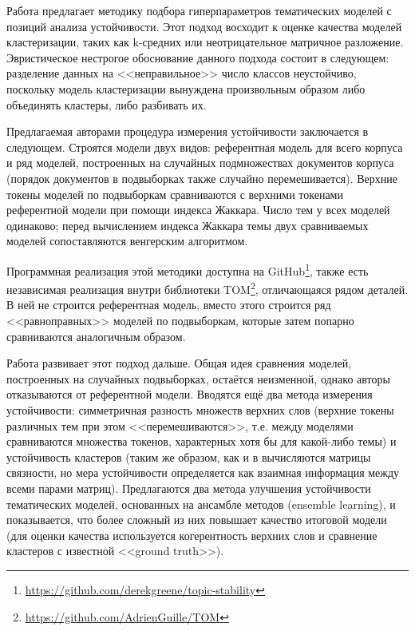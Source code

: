 Работа \cite{greene14howmany} предлагает методику подбора гиперпараметров тематических моделей с позиций анализа устойчивости. Этот подход восходит к оценке качества моделей кластеризации, таких как k-средних или неотрицательное матричное разложение. Эвристическое нестрогое обоснование данного подхода состоит в следующем: разделение данных на <<неправильное>> число классов неустойчиво, поскольку модель кластеризации вынуждена произвольным образом либо объединять кластеры, либо разбивать их.

Предлагаемая авторами процедура измерения устойчивости заключается в следующем. Строятся модели двух видов: референтная модель для всего корпуса и ряд моделей, построенных на случайных подмножествах документов корпуса (порядок документов в подвыборках также случайно перемешивается). Верхние токены моделей по подвыборкам сравниваются с верхними токенами референтной модели при помощи индекса Жаккара. Число тем у всех моделей одинаково; перед вычислением индекса Жаккара темы двух сравниваемых моделей сопоставляются венгерским алгоритмом.

Программная реализация этой методики доступна на GitHub\footnote{\url{https://github.com/derekgreene/topic-stability}}, также есть независимая реализация внутри библиотеки TOM\footnote{\url{https://github.com/AdrienGuille/TOM}}, отличающаяся рядом деталей. В ней не строится референтная модель, вместо этого строится ряд <<равноправных>> моделей по подвыборкам, которые затем попарно сравниваются аналогичным образом.

Работа \cite{belford2018stability} развивает этот подход дальше. Общая идея сравнения моделей, построенных на случайных подвыборках, остаётся неизменной, однако авторы отказываются от референтной модели. Вводятся ещё два метода измерения устойчивости: симметричная разность множеств верхних слов (верхние токены различных тем при этом <<перемешиваются>>, т.е. между моделями сравниваются множества токенов, характерных хотя бы для какой-либо темы) и устойчивость кластеров (таким же образом, как и в \cite{Brunet4164} вычисляются матрицы связности, но мера устойчивости определяется как взаимная информация между всеми парами матриц). Предлагаются два метода улучшения устойчивости тематических моделей, основанных на ансамбле методов (ensemble learning), и показывается, что более сложный из них повышает качество итоговой модели (для оценки качества используется когерентность верхних слов и сравнение кластеров с известной <<ground truth>>).

